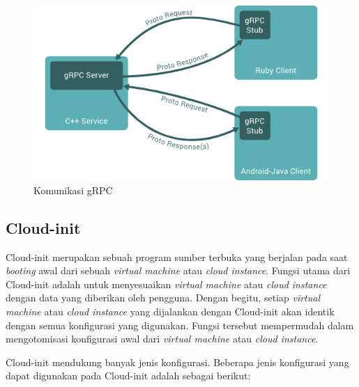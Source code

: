 \begin{figure}[H]
  \centering
  \includegraphics[scale=0.5]{gambar/grpc-usage-image.png}
  \caption{Komunikasi gRPC \parencite{grpc-website-docs-overview}}
  \label{fig:grpc-top-level}
\end{figure}

\subsection{Cloud-init}

Cloud-init merupakan sebuah program sumber terbuka yang berjalan pada saat
\emph{booting} awal dari sebuah \emph{virtual machine} atau \emph{cloud instance}.
Fungsi utama dari Cloud-init adalah untuk menyesuaikan \emph{virtual machine}
atau \emph{cloud instance} dengan data yang diberikan oleh pengguna. Dengan begitu,
setiap \emph{virtual machine} atau \emph{cloud instance} yang dijalankan dengan Cloud-init
akan identik dengan semua konfigurasi yang digunakan. Fungsi tersebut mempermudah dalam 
mengotomisasi konfigurasi awal dari \emph{virtual machine} atau \emph{cloud instance}.

Cloud-init mendukung banyak jenis konfigurasi. Beberapa jenis konfigurasi yang dapat digunakan
pada Cloud-init adalah sebagai berikut:

